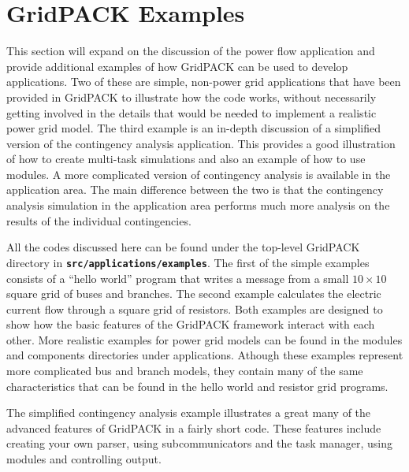 \chapter{GridPACK Examples}

This section will expand on the discussion of the power flow application and
provide additional examples of how GridPACK can be used to develop applications.
Two of these are simple, non-power grid applications that have been provided in
GridPACK to illustrate how the code works, without necessarily getting involved in the details that would be needed to implement a realistic power grid model. The third example is an in-depth discussion of a simplified version of the contingency analysis application. This provides a good illustration of how to create multi-task simulations and also an example of how to use modules. A more complicated version of contingency analysis is available in the application area. The main difference between the two is that the contingency analysis simulation in the application area performs much more analysis on the results of the individual contingencies.

All the codes discussed here can be found under the top-level GridPACK directory
in\newline
\texttt{\textbf{src/applications/examples}}.
The first of the simple examples consists of a ``hello world'' program that
writes a message from a small $10 \times 10$ square grid of buses and branches.
The second example calculates the electric current flow through a square grid of
resistors. Both examples are designed to show how the basic features of the
GridPACK framework interact with each other. More realistic examples for
power grid models can be found in the modules and components directories under applications. Athough these examples represent more complicated bus and branch models, they contain many of the same characteristics that can be found in the hello world and resistor grid programs.

The simplified contingency analysis example illustrates a great many of the advanced features of GridPACK in a fairly short code. These features include creating your own parser, using subcommunicators and the task manager, using modules and controlling output.
\newline
\hyperlink{topDoc}{\color{blue}{Top}}
